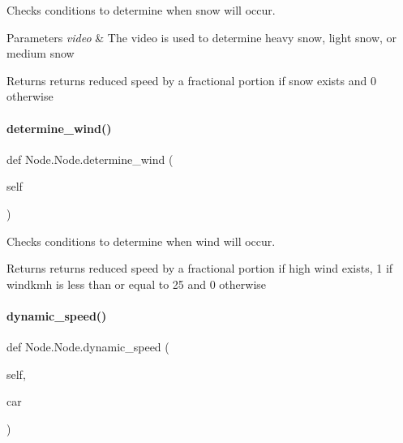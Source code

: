 Checks conditions to determine when snow will occur. 


\begin{DoxyParams}{Parameters}
{\em video} & The video is used to determine heavy snow, light snow, or medium snow \\
\hline
\end{DoxyParams}
\begin{DoxyReturn}{Returns}
returns reduced speed by a fractional portion if snow exists and 0 otherwise 
\end{DoxyReturn}
\mbox{\label{class_node_1_1_node_a07838912223c0dc314f0bba74a2abb5f}} 
\paragraph{\texorpdfstring{determine\_wind()}{determine\_wind()}}
{\footnotesize\ttfamily def Node.\+Node.\+determine\+\_\+wind (\begin{DoxyParamCaption}\item[{}]{self }\end{DoxyParamCaption})}



Checks conditions to determine when wind will occur. 

\begin{DoxyReturn}{Returns}
returns reduced speed by a fractional portion if high wind exists, 1 if windkmh is less than or equal to 25 and 0 otherwise 
\end{DoxyReturn}
\mbox{\label{class_node_1_1_node_a5e3ffc50f87858774b84e49a7b3b6324}} 
\paragraph{\texorpdfstring{dynamic\_speed()}{dynamic\_speed()}}
{\footnotesize\ttfamily def Node.\+Node.\+dynamic\+\_\+speed (\begin{DoxyParamCaption}\item[{}]{self,  }\item[{}]{car }\end{DoxyParamCaption})}



